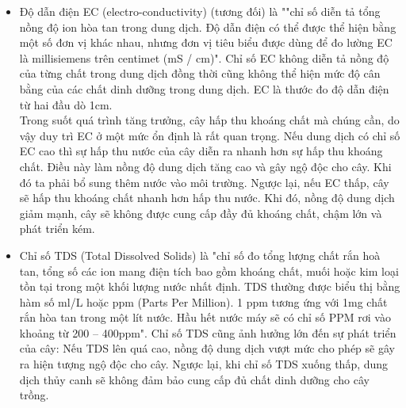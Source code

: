 \documentclass[a4paper,12pt,oneside]{article}
\begin{document}
\begin{itemize}
\item Độ dẫn điện EC (electro-conductivity) (tương đối) là ""chỉ số diễn tả tổng nồng độ ion hòa tan trong dung dịch. Độ dẫn điện có thể được thể hiện bằng một số đơn vị khác nhau, nhưng đơn vị tiêu biểu được dùng để đo lường EC là millisiemens trên centimet (mS / cm)"\cite{ec}. Chỉ số EC không diễn tả nồng độ của từng chất trong dung dịch đồng thời cũng không thể hiện mức độ cân bằng của các chất dinh dưỡng trong dung dịch. EC là thước đo độ dẫn điện từ hai đầu dò 1cm.\\
Trong suốt quá trình tăng trưởng, cây hấp thu khoáng chất mà chúng cần, do vậy duy trì EC ở một mức ổn định là rất quan trọng. Nếu dung dịch có chỉ số EC cao thì sự hấp thu nước của cây diễn ra nhanh hơn sự hấp thu khoáng chất. Điều này làm nồng độ dung dịch tăng cao và gây ngộ độc cho cây. Khi đó ta phải bổ sung thêm nước vào môi trường. Ngược lại, nếu EC thấp, cây sẽ hấp thu khoáng chất nhanh hơn hấp thu nước. Khi đó, nồng độ dung dịch giảm mạnh, cây sẽ không được cung cấp đầy đủ khoáng chất, chậm lớn và phát triển kém.

\item Chỉ số TDS (Total Dissolved Solids) là "chỉ số đo tổng lượng chất rắn hoà tan, tổng số các ion mang điện tích bao gồm khoáng chất, muối hoặc kim loại tồn tại trong một khối lượng nước nhất định. TDS thường được biểu thị bằng hàm số ml/L hoặc ppm (Parts Per Million). 1 ppm tương ứng với 1mg chất rắn hòa tan trong một lít nước. Hầu hết nước máy sẽ có chỉ số PPM rơi vào khoảng từ 200 – 400ppm"\cite{ec}. Chỉ số TDS cũng ảnh hưởng lớn đến sự phát triển của cây: Nếu TDS lên quá cao, nồng độ dung dịch vượt mức cho phép sẽ gây ra hiện tượng ngộ độc cho cây. Ngược lại, khi chỉ số TDS xuống thấp, dung dịch thủy canh sẽ không đảm bảo cung cấp đủ chất dinh dưỡng cho cây trồng.


\end{itemize}
\end{document}
